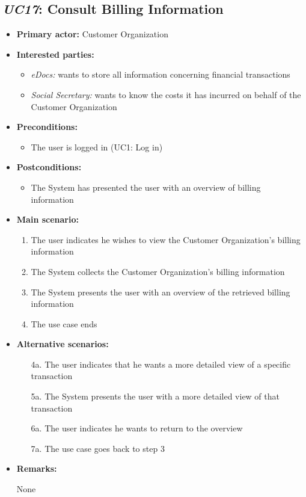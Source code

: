 \documentclass[a4paper,10pt]{article}
\begin{document}
\subsection{\emph{UC17}: Consult Billing Information}
\begin{itemize}
	\item \textbf{Primary actor:} Customer Organization
	\item \textbf{Interested parties:} 
	\begin{itemize}
		\item \textit{eDocs:} wants to store all information concerning financial transactions
		\item \textit{Social Secretary:} wants to know the costs it has incurred on behalf of the Customer Organization
	\end{itemize}
	
	\item \textbf{Preconditions:}
	\begin{itemize}
		\item The user is logged in (UC1: Log in)
	\end{itemize}
	
	\item \textbf{Postconditions:}
	\begin{itemize}
		\item The System has presented the user with an overview of billing information
	\end{itemize}
	
	\item \textbf{Main scenario:} 
	\begin{enumerate}
		\item The user indicates he wishes to view the Customer Organization's billing information
		\item The System collects the Customer Organization's billing information
		\item The System presents the user with an overview of the retrieved billing information
		\item The use case ends
	\end{enumerate}
	
	\item \textbf{Alternative scenarios:} 
	\begin{enumerate}
		\item [4a.] The user indicates that he wants a more detailed view of a specific transaction
		\item [5a.] The System presents the user with a more detailed view of that transaction
		\item [6a.] The user indicates he wants to return to the overview
		\item [7a.] The use case goes back to step 3
	\end{enumerate}
	
	\item \textbf{Remarks:}
	\begin{itemize}
		None
	\end{itemize}
\end{itemize}
\end{document}
